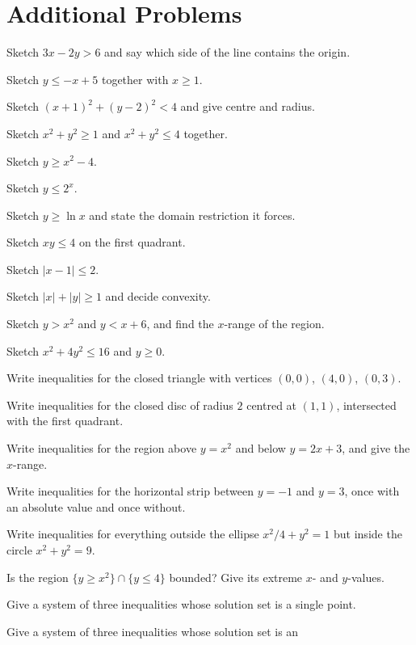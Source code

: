 \section{Additional Problems}

\begin{problems}
  \item Sketch $3x-2y>6$ and say which side of the line contains the
        origin.
  \item Sketch $y\le -x+5$ together with $x\ge1$.
  \item Sketch $(x+1)^{2}+(y-2)^{2}<4$ and give centre and radius.
  \item Sketch $x^{2}+y^{2}\ge 1$ and $x^{2}+y^{2}\le 4$ together.
  \item Sketch $y\ge x^{2}-4$.
  \item Sketch $y\le 2^{x}$.
  \item Sketch $y\ge\ln x$ and state the domain restriction it forces.
  \item Sketch $xy\le 4$ on the first quadrant.
  \item Sketch $|x-1|\le 2$.
  \item Sketch $|x|+|y|\ge 1$ and decide convexity.
  \item Sketch $y>x^{2}$ and $y<x+6$, and find the $x$-range of the
        region.
  \item Sketch $x^{2}+4y^{2}\le 16$ and $y\ge 0$.
  \item Write inequalities for the closed triangle with vertices $(0,0)$,
        $(4,0)$, $(0,3)$.
  \item Write inequalities for the closed disc of radius $2$ centred at
        $(1,1)$, intersected with the first quadrant.
  \item Write inequalities for the region above $y=x^{2}$ and below
        $y=2x+3$, and give the $x$-range.
  \item Write inequalities for the horizontal strip between $y=-1$ and
        $y=3$, once with an absolute value and once without.
  \item Write inequalities for everything outside the ellipse
        $x^{2}/4+y^{2}=1$ but inside the circle $x^{2}+y^{2}=9$.
  \item Is the region $\{y\ge x^{2}\}\cap\{y\le 4\}$ bounded? Give its
        extreme $x$- and $y$-values.
  \item Give a system of three inequalities whose solution set is a single
        point.
  \item Give a system of three inequalities whose solution set is an

\end{problems}
